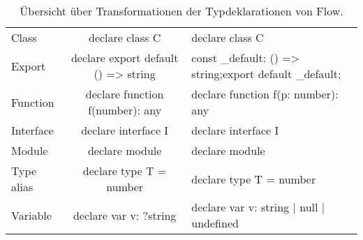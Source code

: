 \begin{table}[tbh]
  \footnotesize
  \begin{tabu} to 
    \midrule
     &  &  \\
    \midrule
    Class       & declare class C {}                   & declare class C {}                       \\
    Export      & declare export default () => string  & const \_default: () => string;\newline export default \_default; \\
    Function    & declare function f(number): any      & declare function f(p: number): any       \\
    Interface   & declare interface I {}               & declare interface I {}                   \\
    Module      & declare module  {}     & declare module  {}         \\
    Type alias  & declare type T = number              & declare type T = number                  \\
    Variable    & declare var v: ?string               & declare var v: string | null | undefined \\
    \midrule
  \end{tabu}
  \caption{Übersicht über Transformationen der Typdeklarationen von Flow.}
  \label{tab:transformation-declarations}
\end{table}
